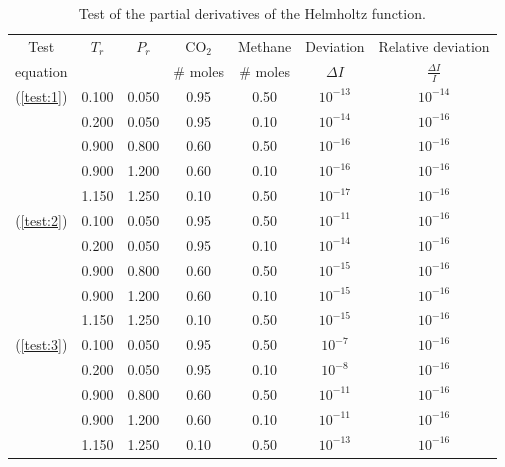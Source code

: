\documentclass[english]{../thermomemo/thermomemo}
\numberwithin{equation}{section}
\newcommand*{\reff}[1]{(\ref{#1})}
\begin{document}
\begin{table}[h!]
  \centering
    \caption{Test of the partial derivatives of the Helmholtz function.}
    \label{tab:testHelmholtz}
    \begin{tabular}{c c c c c c c}
      \hline
      Test 			& $T_r$ & $P_r$ & CO$_2$	& Methane	& Deviation 		& Relative deviation \\
      equation		&		&		& \# moles	& \# moles	& $\Delta I$		& $\frac{\Delta I}{I}$\\
      \hline
      \reff{test:1}	& 0.100	& 0.050	& 0.95		&0.50		& $10^{-13}$ 	& $10^{-14}$	\\
      				& 0.200	& 0.050	& 0.95		&0.10		& $10^{-14}$	& $10^{-16}$	\\
      				& 0.900	& 0.800	& 0.60		&0.50		& $10^{-16}$	& $10^{-16}$	\\
      				& 0.900	& 1.200	& 0.60		&0.10		& $10^{-16}$	& $10^{-16}$	\\
      				& 1.150	& 1.250	& 0.10		&0.50		& $10^{-17}$	& $10^{-16}$	\\
      \reff{test:2}	& 0.100	& 0.050	& 0.95		&0.50		& $10^{-11}$	& $10^{-16}$	\\
      				& 0.200	& 0.050	& 0.95		&0.10		& $10^{-14}$	& $10^{-16}$	\\
      				& 0.900	& 0.800	& 0.60		&0.50		& $10^{-15}$	& $10^{-16}$	\\
      				& 0.900	& 1.200	& 0.60		&0.10		& $10^{-15}$	& $10^{-16}$	\\
      				& 1.150	& 1.250	& 0.10		&0.50		& $10^{-15}$	& $10^{-16}$	\\
      \reff{test:3}	& 0.100	& 0.050	& 0.95		&0.50		& $10^{-7}$		& $10^{-16}$	\\
      				& 0.200	& 0.050	& 0.95		&0.10		& $10^{-8}$		& $10^{-16}$	\\
      				& 0.900	& 0.800	& 0.60		&0.50		& $10^{-11}$	& $10^{-16}$	\\
      				& 0.900	& 1.200	& 0.60		&0.10		& $10^{-11}$	& $10^{-16}$	\\
      				& 1.150	& 1.250	& 0.10		&0.50		& $10^{-13}$	& $10^{-16}$	\\
      \hline
    \end{tabular}
\end{table}
\end{document}

